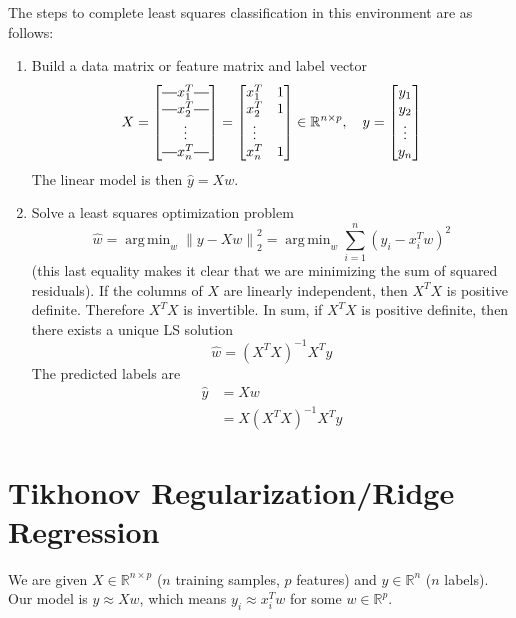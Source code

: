 \documentclass[12pt]{article}
\theoremstyle{definition}
\DeclareMathOperator*{\argmin}{arg\,min}
\newcommand{\R}{\mathbb{R}}
\newcommand{\norm}[1]{\left\lVert#1\right\rVert}
\newcommand*{\horzbar}{\rule[.5ex]{2.5ex}{0.5pt}}
\begin{document}
The steps to complete least squares classification in this environment are as follows:
\begin{enumerate}
	\item Build a data matrix or feature matrix and label vector
	\begin{equation}
		X = 
		\begin{bmatrix}
		\horzbar x_1^T \horzbar \\
		\horzbar x_2^T \horzbar \\
		\vdots \\
		\horzbar x_n^T \horzbar
		\end{bmatrix} =
		\begin{bmatrix}
		x_1^T & 1 \\
		x_2^T & 1 \\
		\vdots \\
		x_n^T & 1
		\end{bmatrix}
		\in \R^{n \times p},
		\quad
		y = 
		\begin{bmatrix}
		y_1 \\
		y_2 \\
		\vdots \\
		y_n
		\end{bmatrix}
	\end{equation}
	The linear model is then $\hat{y} = Xw$.
	\item Solve a least squares optimization problem 
	\begin{equation}
	 	\hat{w} = \argmin_w \norm{y - Xw}_2^2 = \argmin_w \sum_{i=1}^n (y_i- x_i^T w)^2
	 \end{equation} 
	 (this last equality makes it clear that we are minimizing the sum of squared residuals). If the columns of $X$ are linearly independent, then $X^T X$ is positive definite. Therefore $X^T X$ is invertible. In sum, if $X^T X$ is positive definite, then there exists a unique LS solution 
	 \begin{equation}
	 	\hat{w} = (X^T X)^{-1} X^T y
	 \end{equation}
	 The predicted labels are
	 \begin{align*}
	 \hat{y} &= Xw \\
	 &= X (X^T X)^{-1} X^T y
	 \end{align*}
\end{enumerate}

\section{Tikhonov Regularization/Ridge Regression}
We are given $X \in \R^{n \times p}$ ($n$ training samples, $p$ features) and $y \in \R^n$ ($n$ labels). Our model is $y \approx Xw$, which means $y_i \approx x_i^T w$ for some $w \in \R^p$. 
\end{document}
